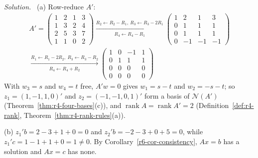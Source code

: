 \documentclass[12pt]{article}
\DeclareMathOperator{\rank}{rank}
\theoremstyle{definition}
\newenvironment{solution}{\par\noindent\textit{Solution.}\ }{\par\smallskip}
\begin{document}
\begin{solution}
(a) Row-reduce \(A'\):
\[
\begin{gathered}
A'=\begin{pmatrix}1&2&1&3\\1&3&2&4\\2&5&3&7\\1&1&0&2\end{pmatrix}
\xrightarrow[R_4\leftarrow R_4-R_1]{R_2\leftarrow R_2-R_1,\ R_3\leftarrow R_3-2R_1}
\begin{pmatrix}1&2&1&3\\0&1&1&1\\0&1&1&1\\0&-1&-1&-1\end{pmatrix}
\\
\xrightarrow[R_4\leftarrow R_4+R_2]{R_1\leftarrow R_1-2R_2,\ R_3\leftarrow R_3-R_2}
\begin{pmatrix}1&0&-1&1\\0&1&1&1\\0&0&0&0\\0&0&0&0\end{pmatrix}
\end{gathered}
\]
With \(w_3=s\) and \(w_4=t\) free, \(A'w=0\) gives \(w_1=s-t\) and \(w_2=-s-t\); so \(z_1=(1,-1,1,0)'\) and
\(z_2=(-1,-1,0,1)'\) form a basis of \(\mathcal N(A')\) (Theorem~\ref{thm:r4-four-bases}(c)), and
\(\rank A=\rank A'=2\) (Definition~\ref{def:r4-rank}, Theorem~\ref{thm:r4-rank-rules}(a)).

(b) \(z_1'b=2-3+1+0=0\) and \(z_2'b=-2-3+0+5=0\), while \(z_1'c=1-1+1+0=1\ne0\). By
Corollary~\ref{r6-cor-consistency}, \(Ax=b\) has a solution and \(Ax=c\) has none.


\end{solution}
\end{document}
